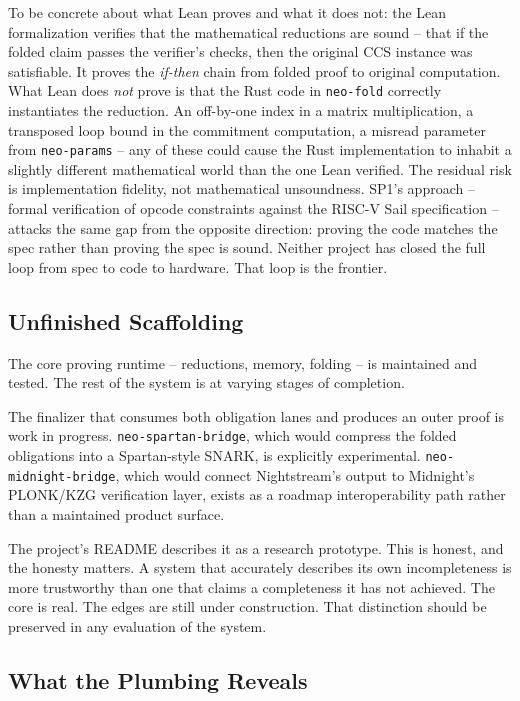 \documentclass[
  11pt,
  openany]{report}
\begin{document}
To be concrete about what Lean proves and what it does not: the Lean
formalization verifies that the mathematical reductions are sound -- that if the
folded claim passes the verifier's checks, then the original CCS instance was
satisfiable. It proves the \emph{if-then} chain from folded proof to original
computation. What Lean does \emph{not} prove is that the Rust code in
\texttt{neo-fold} correctly instantiates the reduction. An off-by-one index in a
matrix multiplication, a transposed loop bound in the commitment computation, a
misread parameter from \texttt{neo-params} -- any of these could cause the Rust
implementation to inhabit a slightly different mathematical world than the one
Lean verified. The residual risk is implementation fidelity, not mathematical
unsoundness. SP1's approach -- formal verification of opcode constraints against
the RISC-V Sail specification -- attacks the same gap from the opposite
direction: proving the code matches the spec rather than proving the spec is
sound. Neither project has closed the full loop from spec to code to hardware.
That loop is the frontier.

\subsection{Unfinished Scaffolding}\label{unfinished-scaffolding}

The core proving runtime -- reductions, memory, folding -- is maintained and
tested. The rest of the system is at varying stages of completion.

The finalizer that consumes both obligation lanes and produces an outer proof is
work in progress. \texttt{neo-spartan-bridge}, which would compress the folded
obligations into a Spartan-style SNARK, is explicitly experimental.
\texttt{neo-midnight-bridge}, which would connect Nightstream's output to
Midnight's PLONK/KZG verification layer, exists as a roadmap interoperability
path rather than a maintained product surface.

The project's README describes it as a research prototype. This is honest, and
the honesty matters. A system that accurately describes its own incompleteness
is more trustworthy than one that claims a completeness it has not achieved. The
core is real. The edges are still under construction. That distinction should be
preserved in any evaluation of the system.

\subsection{What the Plumbing Reveals}\label{what-the-plumbing-reveals}
\end{document}
